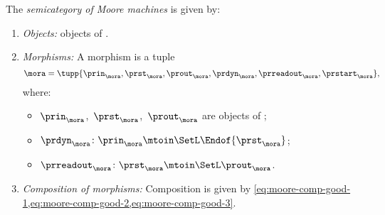 \begin{definition}[\Moore]
    \label{def:Moore}
    The \emph{semicategory of Moore machines} \Moore is given by:
    \begin{enumerate}
        \item \emph{Objects:} objects of \SetL.
        \item \emph{Morphisms:}
              A morphism is a tuple
              \begin{equation}
                  \mora = \tupp{\prin_{\mora},\prst_{\mora},\prout_{\mora},\prdyn_{\mora},\prreadout_{\mora},\prstart_{\mora}},
              \end{equation}
              where:
              \begin{itemize}
                  \item $\prin_{\mora}$,~$\prst_{\mora}$,~$\prout_{\mora}$ are objects of \SetL;
                  \item $ \prdyn_{\mora} \colon \prin_{\mora} \mtoin\SetL  \Endof{\prst_{\mora}}$;
                  \item $ \prreadout_{\mora} \colon \prst_{\mora}  \mtoin\SetL \prout_{\mora}$.
              \end{itemize}
        \item \emph{Composition of morphisms:}
              Composition is given by \cref{eq:moore-comp-good-1,eq:moore-comp-good-2,eq:moore-comp-good-3}.
    \end{enumerate}
\end{definition}

